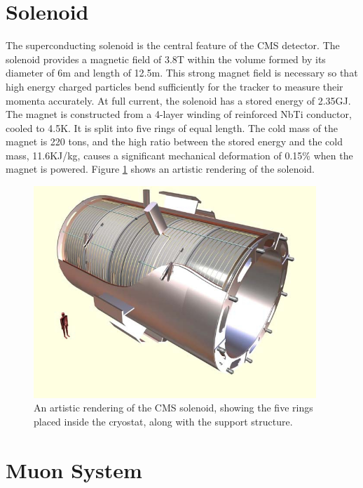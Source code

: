 
\section{Solenoid}

The superconducting solenoid is the central feature of the CMS detector. The solenoid provides a magnetic field of 3.8\unit{T} within the volume formed by its diameter of 6\unit{m} and length of 12.5\unit{m}. This strong magnet field is necessary so that high energy charged particles bend sufficiently for the tracker to measure their momenta accurately. At full current, the solenoid has a stored energy of 2.35\unit{GJ}. The magnet is constructed from a 4-layer winding of reinforced NbTi conductor, cooled to 4.5\unit{K}. It is split into five rings of equal length. The cold mass of the magnet is 220 tons, and the high ratio between the stored energy and the cold mass, 11.6\unit{KJ/kg}, causes a significant mechanical deformation of 0.15\% when the magnet is powered. Figure \ref{fig:solenoid} shows an artistic rendering of the solenoid.

\begin{figure}[hbt]
\begin{center}
\includegraphics[width=0.95\textwidth]{figures/CMS_solenoid.jpg}
\caption{An artistic rendering of the CMS solenoid, showing the five rings placed inside the cryostat, along with the support structure.}
\label{fig:solenoid}
\end{center}
\end{figure}

\section{Muon System}
\label{sec:muon-system}

